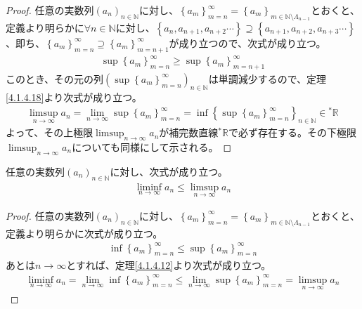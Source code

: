 \documentclass[dvipdfmx]{jsarticle}
\begin{document}
\begin{proof}
任意の実数列$\left( a_{n} \right)_{n \in \mathbb{N}}$に対し、$\left\{ a_{m} \right\}_{m = n}^{\infty} = \left\{ a_{m} \right\}_{m \in \mathbb{N} \setminus \varLambda_{n - 1}}$とおくと、定義より明らかに$\forall n \in \mathbb{N}$に対し、$\left\{ a_{n},a_{n + 1},a_{n + 2}\cdots \right\} \supseteq \left\{ a_{n + 1},a_{n + 2},a_{n + 3}\cdots \right\}$、即ち、$\left\{ a_{m} \right\}_{m = n}^{\infty} \supseteq \left\{ a_{m} \right\}_{m = n + 1}^{\infty}$が成り立つので、次式が成り立つ。
\begin{align*}
\sup\left\{ a_{m} \right\}_{m = n}^{\infty} \geq \sup\left\{ a_{m} \right\}_{m = n + 1}^{\infty}
\end{align*}
このとき、その元の列$\left( \sup\left\{ a_{m} \right\}_{m = n}^{\infty} \right)_{n \in \mathbb{N}}$は単調減少するので、定理\ref{4.1.4.18}より次式が成り立つ。
\begin{align*}
\limsup_{n \rightarrow \infty}a_{n} = \lim_{n \rightarrow \infty}{\sup\left\{ a_{m} \right\}_{m = n}^{\infty}} = \inf\left\{ \sup\left\{ a_{m} \right\}_{m = n}^{\infty} \right\}_{n \in \mathbb{N}} \in{}^{*}\mathbb{R}
\end{align*}
よって、その上極限$\limsup_{n \rightarrow \infty}a_{n}$が補完数直線${}^{*}\mathbb{R}$で必ず存在する。その下極限$\limsup_{n \rightarrow \infty}a_{n}$についても同様にして示される。
\end{proof}
\begin{thm}\label{4.1.6.2}
任意の実数列$\left( a_{n} \right)_{n \in \mathbb{N}}$に対し、次式が成り立つ。
\begin{align*}
\liminf_{n \rightarrow \infty}a_{n} \leq \limsup_{n \rightarrow \infty}a_{n}
\end{align*}
\end{thm}
\begin{proof}
任意の実数列$\left( a_{n} \right)_{n \in \mathbb{N}}$に対し、$\left\{ a_{m} \right\}_{m = n}^{\infty} = \left\{ a_{m} \right\}_{m \in \mathbb{N} \setminus \varLambda_{n - 1}}$とおくと、定義より明らかに次式が成り立つ。
\begin{align*}
\inf\left\{ a_{m} \right\}_{m = n}^{\infty} \leq \sup\left\{ a_{m} \right\}_{m = n}^{\infty}
\end{align*}
あとは$n \rightarrow \infty$とすれば、定理\ref{4.1.4.12}より次式が成り立つ。
\begin{align*}
\liminf_{n \rightarrow \infty}a_{n} = \lim_{n \rightarrow \infty}{\inf\left\{ a_{m} \right\}_{m = n}^{\infty}} \leq \lim_{n \rightarrow \infty}{\sup\left\{ a_{m} \right\}_{m = n}^{\infty}} = \limsup_{n \rightarrow \infty}a_{n}
\end{align*}
\end{proof}
\end{document}
